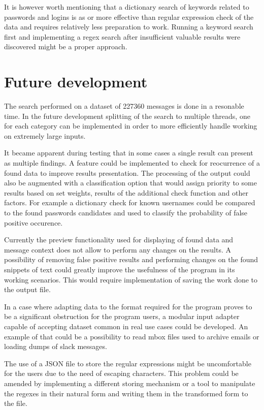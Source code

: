 \documentclass[a4paper,twoside,12pt]{book}
\begin{document}
It is however worth mentioning that a dictionary search of keywords related to passwords and
logins is as or more effective than regular expression check of the data and requires relatively
less preparation to work. Running a keyword search first and implementing a regex search after 
insufficient valuable results were discovered might be a proper approach.

\section{Future development}

The search performed on a dataset of 227360 messages is done in a resonable time. In the future development
splitting of the search to multiple threads, one for each category can be implemented in order to more efficiently
handle working on extremely large inputs. 

It became apparent during testing that in some cases a single result can present as multiple findings. 
A feature could be implemented to check for reocurrence of a found data to improve
results presentation. The processing of the output could also be augmented with a classification
option that would assign priority to some results based on set weights, results of the additional
check function and other factors. For example a dictionary check for known usernames could be compared to
the found passwords candidates and used to classify the probability of false positive occurence. 


Currently the preview functionality used for displaying of found data and message context 
does not allow to perform any changes on the results. A possibility of removing false positive 
results and performing changes on the found snippets of text could greatly improve the 
usefulness of the program in its working scenarios. This would require implementation of saving the work
done to the output file.

In a case where adapting data to the format required for the program proves to be a significant 
obstruction for the program users, a modular input adapter capable of accepting dataset common in 
real use cases could be developed. An example of that could be a possibility to read mbox files 
used to archive emails or loading dumps of slack messages.

The use of a JSON file to store the regular expressions might be uncomfortable for the users due to the need of escaping characters. 
This problem could be amended by implementing a different storing mechanism or a tool to manipulate the regexes in their natural form 
and writing them in the transformed form to the file. 
\end{document}
